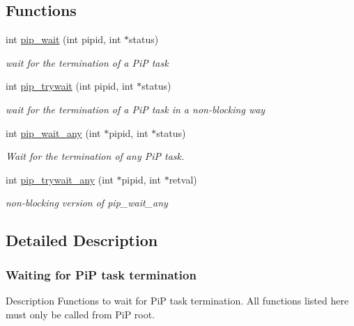 \documentclass[twoside]{book}
\begin{document}
\subsection*{Functions}
\begin{DoxyCompactItemize}
\item 
int \hyperlink{group__pip-3-wait_gae04520bc29d3ec85d7090f7e645de27d}{pip\-\_\-wait} (int pipid, int $\ast$status)
\begin{DoxyCompactList}\small\item\em wait for the termination of a Pi\-P task \end{DoxyCompactList}\item 
int \hyperlink{group__pip-3-wait_ga9e786d15401af041842f3f503c962a4b}{pip\-\_\-trywait} (int pipid, int $\ast$status)
\begin{DoxyCompactList}\small\item\em wait for the termination of a Pi\-P task in a non-\/blocking way \end{DoxyCompactList}\item 
int \hyperlink{group__pip-3-wait_ga621bba73fda6b2bbe3c04e0c65006d36}{pip\-\_\-wait\-\_\-any} (int $\ast$pipid, int $\ast$status)
\begin{DoxyCompactList}\small\item\em Wait for the termination of any Pi\-P task. \end{DoxyCompactList}\item 
int \hyperlink{group__pip-3-wait_ga65731447fedb85cbe4d5c38093383a20}{pip\-\_\-trywait\-\_\-any} (int $\ast$pipid, int $\ast$retval)
\begin{DoxyCompactList}\small\item\em non-\/blocking version of {\ttfamily pip\-\_\-wait\-\_\-any} \end{DoxyCompactList}\end{DoxyCompactItemize}


\subsection{Detailed Description}
\hypertarget{pip-wait}{}\subsubsection{Waiting for Pi\-P task termination}\label{pip-wait}
\begin{DoxyParagraph}{Description}
Functions to wait for Pi\-P task termination. All functions listed here must only be called from Pi\-P root. 
\end{DoxyParagraph}
\end{document}
